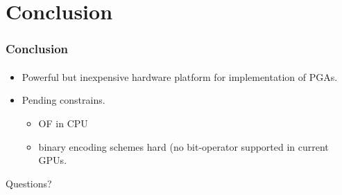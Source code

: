 \section{Conclusion}
\frame
{
\frametitle{Conclusion}
\framesubtitle{}
\begin{itemize}
	\item Powerful but inexpensive hardware platform for implementation of PGAs.
	\item Pending constrains.
	\begin{itemize}
		\item OF in CPU
		\item binary encoding schemes hard (no bit-operator supported in current GPUs.
	\end{itemize}
\end{itemize}
}

\frame
{
\vspace{1cm}
\begin{center}
	Questions?
\end{center}

}
